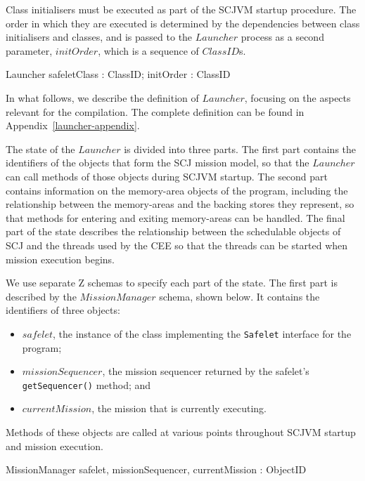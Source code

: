 Class initialisers must be executed as part of the SCJVM startup
procedure.
The order in which they are executed is determined by the dependencies
between class initialisers and classes, and is passed to the
$Launcher$ process as a second parameter, $initOrder$, which is a
sequence of $ClassID$s.
\begin{circus}
  \circprocess Launcher \circdef safeletClass : ClassID; initOrder : \seq ClassID \circspot \circbegin
\end{circus}

In what follows, we describe the definition of $Launcher$, focusing on
the aspects relevant for the compilation.
The complete definition can be found in
Appendix~\ref{launcher-appendix}.

The state of the $Launcher$ is divided into three parts.
The first part contains the identifiers of the objects that form the
SCJ mission model, so that the $Launcher$ can call methods of those
objects during SCJVM startup.
The second part contains information on the memory-area objects of
the program, including the relationship between the memory-areas and
the backing stores they represent, so that methods for entering and
exiting memory-areas can be handled.
The final part of the state describes the relationship between the
schedulable objects of SCJ and the threads used by the CEE so that the
threads can be started when mission execution begins.

We use separate Z schemas to specify each part of the state.
The first part is described by the $MissionManager$ schema, shown
below.
It contains the identifiers of three objects:
\begin{itemize}
\item $safelet$, the instance of the class implementing the
  \texttt{Safelet} interface for the program;
\item $missionSequencer$, the mission sequencer
  returned by the safelet's \texttt{getSequencer()} method; and
\item $currentMission$, the mission that is currently executing.
\end{itemize}
Methods of these objects are called at various points throughout SCJVM
startup and mission execution.
\begin{schema}{MissionManager}
  safelet, missionSequencer, currentMission : ObjectID
\end{schema}


